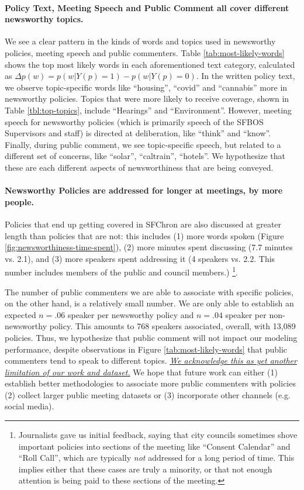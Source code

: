 \documentclass[11pt]{article}
\begin{document}
\paragraph{Policy Text, Meeting Speech and Public Comment all cover different newsworthy topics.}
\label{sct:newsworthiness:textual-analysis}
We see a clear pattern in the kinds of words and topics used in newsworthy policies, meeting speech and public commenters. Table \ref{tab:most-likely-words} shows the top most likely words in each aforementioned text category, calculated as $\Delta p(w) = p(w | Y(p)=1) - p(w | Y(p)=0)$. In the written policy text, we observe topic-specific words like ``housing'', ``covid'' and ``cannabis'' more in newsworthy policies. Topics that were more likely to receive coverage, shown in Table \ref{tbl:top-topics}, include ``Hearings'' and ``Environment''. However, meeting speech for newsworthy policies (which is primarily speech of the SFBOS Supervisors and staff) is directed at deliberation, like ``think'' and ``know''. Finally, during public comment, we see topic-specific speech, but related to a different set of concerns, like ``solar'', ``caltrain'', ``hotels''. We hypothesize that these are each different aspects of newsworthiness that are being conveyed.

\paragraph{Newsworthy Policies are addressed for longer at meetings, by more people.}
Policies that end up getting covered in SFChron are also discussed at greater length than policies that are not: this includes (1) more words spoken (Figure \ref{fig:newsworthiness-time-spent}), (2) more minutes spent discussing (7.7 minutes vs. 2.1), and (3) more speakers spent addressing it (4 speakers vs. 2.2. This number includes members of the public and council members.)
\footnote{Journalists gave us initial feedback, saying that city councils sometimes shove important policies into sections of the meeting like ``Consent Calendar'' and ``Roll Call'', which are typically \textit{not} addressed for a long period of time. This implies either that these cases are truly a minority, or that not enough attention is being paid to these sections of the meeting.
}.  %

The number of public commenters we are able to associate with specific policies, on the other hand, is a relatively small number. We are only able to establish an expected $n=.06$ speaker per newsworthy policy and $n=.04$ speaker per non-newsworthy policy. This amounts to 768 speakers associated, overall, with 13,089 policies. Thus, we hypothesize that public comment will not impact our modeling performance, despite observations in Figure \ref{tab:most-likely-words} that public commenters tend to speak to different topics. \textit{\ul{We acknowledge this as yet another limitation of our work and dataset.}} We hope that future work can either (1) establish better methodologies to associate more public commenters with policies (2) collect larger public meeting datasets or (3) incorporate other channels (e.g. social media).
\end{document}
